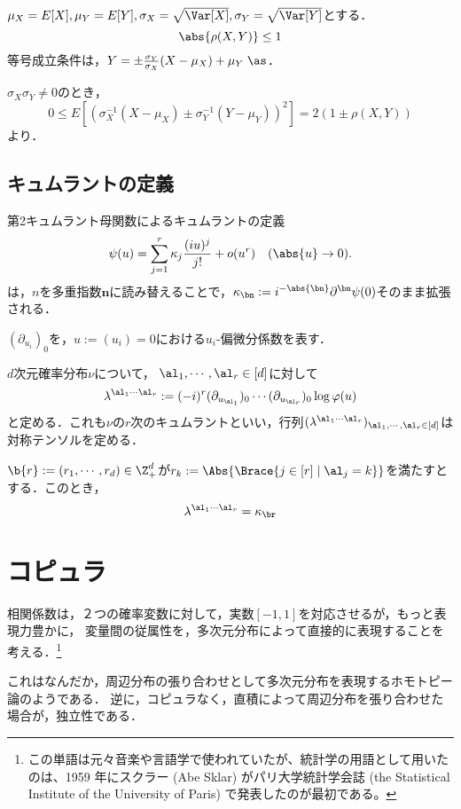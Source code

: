 \documentclass[uplatex,dvipdfmx]{jsreport}
\begin{document}
\begin{proposition}[相関係数の値域]
    $\mu_X=E[X],\mu_Y=E[Y],\sigma_X=\sqrt{\Var[X]},\sigma_Y=\sqrt{\Var[Y]}$とする．
    \[\abs{\rho(X,Y)}\le 1\]
    等号成立条件は，$Y=\pm\frac{\sigma_Y}{\sigma_X}(X-\mu_X)+\mu_Y\;\as$．
\end{proposition}
\begin{Proof}
    $\sigma_X\sigma_Y\ne 0$のとき，
    \[0\le E[(\sigma_X^{-1}(X-\mu_X)\pm\sigma_Y^{-1}(Y-\mu_Y))^2]=2(1\pm\rho(X,Y))\]
    より．
\end{Proof}

\subsection{キュムラントの定義}

\begin{definition}\label{def-higher-cumulant}
    第2キュムラント母関数によるキュムラントの定義
    \[\psi(u)=\sum^r_{j=1}\kappa_j\frac{(iu)^j}{j!}+o(u^r)\quad(\abs{u}\to0).\]
    は，$n$を多重指数$\mathbf{n}$に読み替えることで，$\kappa_{\bn}:=i^{-\abs{\bn}}\partial^{\bn}\psi(0)$そのまま拡張される．
\end{definition}

\begin{notation}
    $(\partial_{u_i})_0$を，$u:=(u_i)=0$における$u_i$-偏微分係数を表す．
\end{notation}

\begin{discussion}[キュムラントのテンソル表現]
    $d$次元確率分布$\nu$について，
    $\al_1,\cdots,\al_r\in[d]$に対して
    \[\lambda^{\al_1\cdots\al_r}:=(-i)^r(\partial_{u_{\al_1}})_0\cdots(\partial_{u_{\al_r}})_0\log\varphi(u)\]
    と定める．これも$\nu$の$r$次のキュムラントといい，行列$(\lambda^{\al_1\cdots\al_r})_{\al_1,\cdots,\al_r\in[d]}$は対称テンソルを定める．
\end{discussion}
\begin{remarks}
    $\b{r}:=(r_1,\cdots,r_d)\in\Z^d_+$が$r_k:=\Abs{\Brace{j\in[r]\mid\al_j=k}}$を満たすとする．このとき，
    \[\lambda^{\al_1\cdots\al_r}=\kappa_{\br}\]
\end{remarks}

\section{コピュラ}

\begin{tcolorbox}[colframe=ForestGreen, colback=ForestGreen!10!white,breakable,colbacktitle=ForestGreen!40!white,coltitle=black,fonttitle=\bfseries\sffamily,
title=]
    相関係数は，２つの確率変数に対して，実数$[-1,1]$を対応させるが，もっと表現力豊かに，
    変量間の従属性を，多次元分布によって直接的に表現することを考える．\footnote{この単語は元々音楽や言語学で使われていたが、統計学の用語として用いたのは、1959 年にスクラー (Abe Sklar) がパリ大学統計学会誌 (the Statistical Institute of the University of Paris) で発表したのが最初である。}

    これはなんだか，周辺分布の張り合わせとして多次元分布を表現するホモトピー論のようである．
    逆に，コピュラなく，直積によって周辺分布を張り合わせた場合が，独立性である．
\end{tcolorbox}
\end{document}

